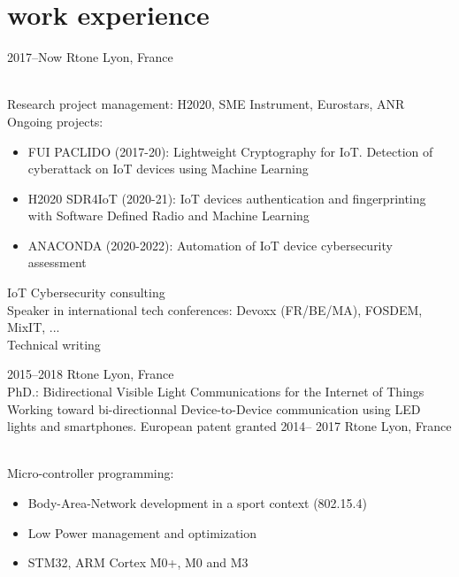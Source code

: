 \documentclass[]{cv-style}          %
\begin{document}
\vspace{0.15cm}
\section{work experience}

\begin{entrylist}
\entry
{2017--Now}
{Rtone}
{Lyon, France}
{\\
Research project management: H2020, SME Instrument, Eurostars, ANR\\
Ongoing projects:
\begin{itemize}
    \item FUI PACLIDO (2017-20): Lightweight Cryptography for IoT. Detection of cyberattack on IoT devices using Machine Learning
    \item H2020 SDR4IoT (2020-21): IoT devices authentication and fingerprinting with Software Defined Radio and Machine Learning
    \item ANACONDA (2020-2022): Automation of IoT device cybersecurity assessment
\end{itemize}
IoT Cybersecurity consulting\\
Speaker in international tech conferences: Devoxx (FR/BE/MA), FOSDEM, MixIT, ...\\
Technical writing
}
\entry
  {2015--2018}
  {Rtone}
  {Lyon, France}
  {\\
  PhD.: Bidirectional Visible Light Communications for
 the Internet of Things\\
  Working toward bi-directionnal Device-to-Device communication using LED lights and smartphones. European patent granted}
\entry
  {2014-- 2017}
  {Rtone}
  {Lyon, France}
  {\\
  Micro-controller programming:
  \begin{itemize}
    \item Body-Area-Network development in a sport context (802.15.4)
    \item Low Power management and optimization
    \item STM32, ARM Cortex M0+, M0 and M3

\end{itemize}}
\end{entrylist}
\end{document}
